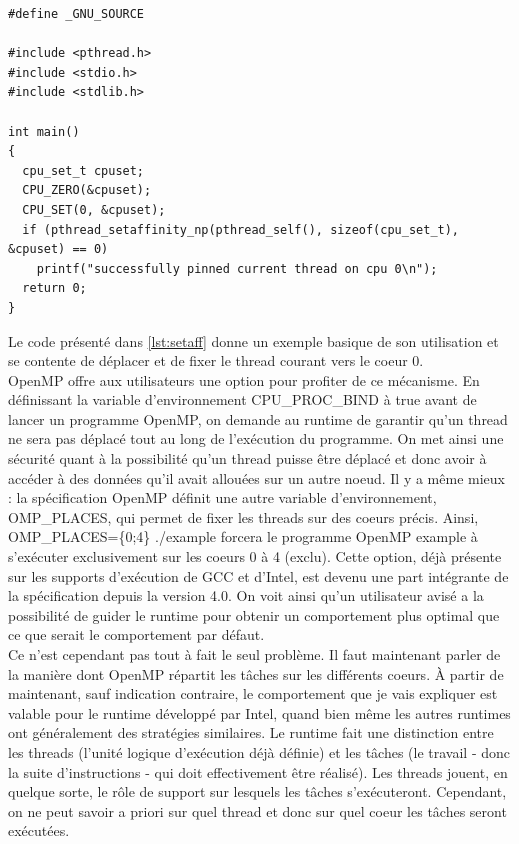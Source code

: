 \documentclass{report}
\begin{document}
\begin{lstlisting}[label={lst:setaff}]
#define _GNU_SOURCE

#include <pthread.h>
#include <stdio.h>
#include <stdlib.h>

int main()
{
  cpu_set_t cpuset;
  CPU_ZERO(&cpuset);
  CPU_SET(0, &cpuset);
  if (pthread_setaffinity_np(pthread_self(), sizeof(cpu_set_t), &cpuset) == 0)
    printf("successfully pinned current thread on cpu 0\n");
  return 0;
}
\end{lstlisting}
Le code présenté dans \ref{lst:setaff} donne un exemple basique de son utilisation et se contente de
déplacer et de fixer le thread courant vers le coeur 0.
\\OpenMP offre aux utilisateurs une option pour profiter de ce mécanisme. En définissant la variable
d'environnement CPU\_PROC\_BIND à true avant de lancer un programme OpenMP, on demande au runtime de 
garantir qu'un thread ne sera pas déplacé tout au long de l'exécution du programme. On met ainsi une
sécurité quant à la possibilité qu'un thread puisse être déplacé et donc avoir à accéder à des données
qu'il avait allouées sur un autre noeud. Il y a même mieux : la spécification OpenMP définit une autre
variable d'environnement, OMP\_PLACES, qui permet de fixer les threads sur des coeurs précis\cite{ompaff}. 
Ainsi, OMP\_PLACES=\{0;4\} ./example forcera le programme OpenMP example à s'exécuter exclusivement sur les
coeurs 0 à 4 (exclu). Cette option, déjà présente sur les supports d'exécution de GCC et d'Intel,
est devenu une part intégrante de la spécification depuis la version 4.0.  On voit ainsi qu'un utilisateur
avisé a la possibilité de guider le runtime pour obtenir un comportement plus optimal que ce que serait
le comportement par défaut\cite{threadaff}. 
\\Ce n'est cependant pas tout à fait le seul problème. Il faut maintenant parler de la manière dont
OpenMP répartit les tâches sur les différents coeurs. À partir de maintenant, sauf indication 
contraire, le comportement que je vais expliquer est valable pour le runtime développé par Intel, quand
bien même les autres runtimes ont généralement des stratégies similaires. Le runtime fait une distinction
entre les threads (l'unité logique d'exécution déjà définie) et les tâches (le travail - donc la suite
d'instructions - qui doit effectivement être réalisé). Les threads jouent, en quelque sorte, le rôle
de support sur lesquels les tâches s'exécuteront. Cependant, on ne peut savoir a priori sur quel thread
et donc sur quel coeur les tâches seront exécutées.
\end{document}
